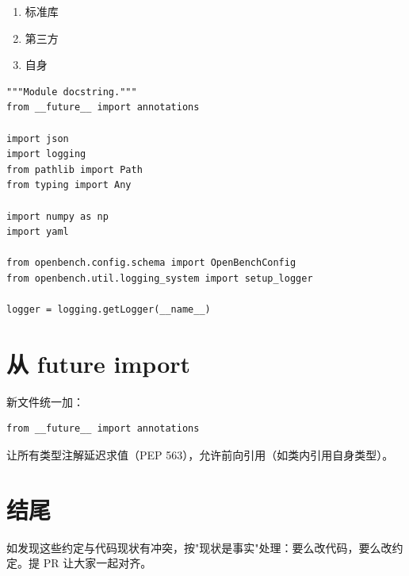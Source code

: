 \begin{enumerate}
  \item 标准库
  \item 第三方
  \item {} 自身
\end{enumerate}

\begin{verbatim}
"""Module docstring."""
from __future__ import annotations

import json
import logging
from pathlib import Path
from typing import Any

import numpy as np
import yaml

from openbench.config.schema import OpenBenchConfig
from openbench.util.logging_system import setup_logger

logger = logging.getLogger(__name__)
\end{verbatim}

\section{从 future import}

新文件统一加：

\begin{verbatim}
from __future__ import annotations
\end{verbatim}

让所有类型注解延迟求值（PEP 563），允许前向引用（如类内引用自身类型）。

\section{结尾}

如发现这些约定与代码现状有冲突，按"现状是事实"处理：要么改代码，要么改约定。提 PR 让大家一起对齐。
